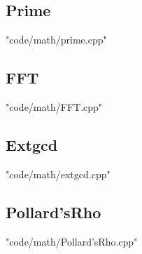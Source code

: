 \documentclass [8pt,a4paper,twocolumn]{article}
\begin{document}
\subsection{Prime}
 {"code/math/prime.cpp"}
\subsection{FFT}
 {"code/math/FFT.cpp"}
\subsection{Extgcd}
 {"code/math/extgcd.cpp"}
\subsection{Pollard’sRho}
 {"code/math/Pollard’sRho.cpp"}


\end{document}
